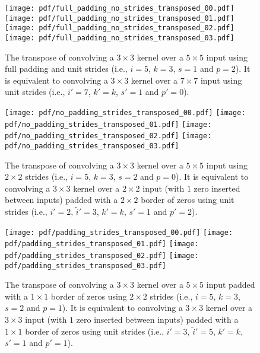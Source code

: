 \documentclass[notitlepage]{report}
\begin{document}
\begin{figure}[p]
    \centering
    \texttt{[image: pdf/full\_padding\_no\_strides\_transposed\_00.pdf]}
    \texttt{[image: pdf/full\_padding\_no\_strides\_transposed\_01.pdf]}
    \texttt{[image: pdf/full\_padding\_no\_strides\_transposed\_02.pdf]}
    \texttt{[image: pdf/full\_padding\_no\_strides\_transposed\_03.pdf]}
    \caption{\label{fig:full_padding_no_strides_transposed} The transpose of
        convolving a $3 \times 3$ kernel over a $5 \times 5$ input using full
        padding and unit strides (i.e., $i = 5$, $k = 3$, $s = 1$ and $p = 2$).
        It is equivalent to convolving a $3 \times 3$ kernel over a $7 \times 7$
        input using unit strides (i.e., $i' = 7$, $k' = k$, $s' = 1$ and $p' =
        0$).}
\end{figure}

\begin{figure}[p]
    \centering
    \texttt{[image: pdf/no\_padding\_strides\_transposed\_00.pdf]}
    \texttt{[image: pdf/no\_padding\_strides\_transposed\_01.pdf]}
    \texttt{[image: pdf/no\_padding\_strides\_transposed\_02.pdf]}
    \texttt{[image: pdf/no\_padding\_strides\_transposed\_03.pdf]}
    \caption{\label{fig:no_padding_strides_transposed} The transpose of
        convolving a $3 \times 3$ kernel over a $5 \times 5$ input using $2
        \times 2$ strides (i.e., $i = 5$, $k = 3$, $s = 2$ and $p = 0$). It is
        equivalent to convolving a $3 \times 3$ kernel over a $2 \times 2$ input
        (with $1$ zero inserted between inputs) padded with a $2 \times 2$
        border of zeros using unit strides (i.e., $i' = 2$, $\tilde{i}' = 3$, $k'
        = k$, $s' = 1$ and $p' = 2$).}
\end{figure}

\begin{figure}[p]
    \centering
    \texttt{[image: pdf/padding\_strides\_transposed\_00.pdf]}
    \texttt{[image: pdf/padding\_strides\_transposed\_01.pdf]}
    \texttt{[image: pdf/padding\_strides\_transposed\_02.pdf]}
    \texttt{[image: pdf/padding\_strides\_transposed\_03.pdf]}
    \caption{\label{fig:padding_strides_transposed} The transpose of convolving
        a $3 \times 3$ kernel over a $5 \times 5$ input padded with a $1 \times
        1$ border of zeros using $2 \times 2$ strides (i.e., $i = 5$, $k = 3$, $s
        = 2$ and $p = 1$). It is equivalent to convolving a $3 \times 3$ kernel
        over a $3 \times 3$ input (with $1$ zero inserted between inputs) padded
        with a $1 \times 1$ border of zeros using unit strides (i.e., $i' = 3$,
        $\tilde{i}' = 5$, $k' = k$, $s' = 1$ and $p' = 1$).}
\end{figure}
\end{document}
